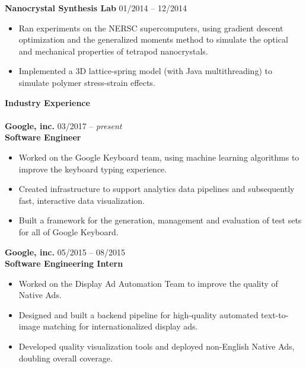 \documentclass{article}
\begin{document}
\noindent
\textbf{Nanocrystal Synthesis Lab}
\hfill 01/2014 -- 12/2014
\begin{itemize}
\vspace{-2.5mm}
\item Ran experiments on the NERSC supercomputers, using gradient descent optimization and the generalized moments method to simulate the optical and mechanical properties of tetrapod nanocrystals.
\vspace{-2.5mm}
\item Implemented a 3D lattice-spring model (with Java multithreading) to simulate polymer stress-strain effects.
\end{itemize}

\noindent
\textbf{{\Large Industry Experience}}\\[-2mm]
\HRule\\
\textbf{Google, inc.}
\hfill 03/2017 -- \textit{present}\\
\textbf{Software Engineer}
\begin{itemize}
\vspace{-2.5mm}
\item Worked on the Google Keyboard team, using machine learning algorithms to improve the keyboard typing experience.
\vspace{-2.5mm}
\item Created infrastructure to support analytics data pipelines and subsequently fast, interactive data visualization.
\vspace{-6.5mm}
\item Built a framework for the generation, management and evaluation of test sets for all of Google Keyboard.
\end{itemize}
\vspace{-2mm}

\noindent
\textbf{Google, inc.}
\hfill 05/2015 -- 08/2015\\
\textbf{Software Engineering Intern}
\begin{itemize}
\vspace{-2.5mm}
\item Worked on the Display Ad Automation Team to improve the quality of Native Ads.
\vspace{-2.5mm}
\item Designed and built a backend pipeline for high-quality automated text-to-image matching for internationalized display ads.
\vspace{-2.5mm}
\item Developed quality visualization tools and deployed non-English Native Ads, doubling overall coverage.
\end{itemize}
\vspace{1mm}
\end{document}
